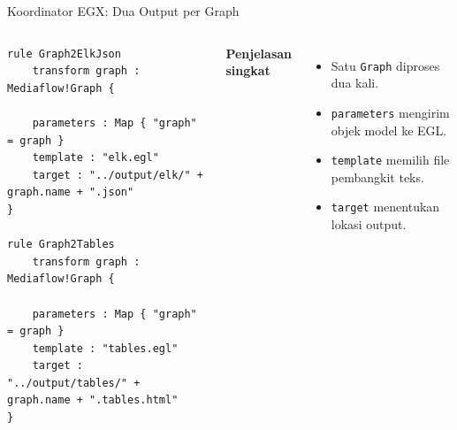 \documentclass[aspectratio=169, table]{beamer}
\begin{document}
\begin{frame}[fragile]{Koordinator EGX: Dua Output per Graph}
\vspace{2pt}
\begin{columns}[T,onlytextwidth]
\begin{lstlisting}[language=egx, basicstyle=\ttfamily\tiny]
rule Graph2ElkJson
    transform graph : Mediaflow!Graph {

    parameters : Map { "graph" = graph }
    template : "elk.egl"
    target : "../output/elk/" + graph.name + ".json"
}

rule Graph2Tables
    transform graph : Mediaflow!Graph {

    parameters : Map { "graph" = graph }
    template : "tables.egl"
    target : "../output/tables/" + graph.name + ".tables.html"
}
\end{lstlisting}

\scriptsize
\textbf{Penjelasan singkat}
\begin{itemize}
  \item Satu \texttt{Graph} diproses dua kali.
  \item \texttt{parameters} mengirim objek model ke EGL.
  \item \texttt{template} memilih file pembangkit teks.
  \item \texttt{target} menentukan lokasi output.
\end{itemize}
\end{columns}
\end{frame}
\end{document}
